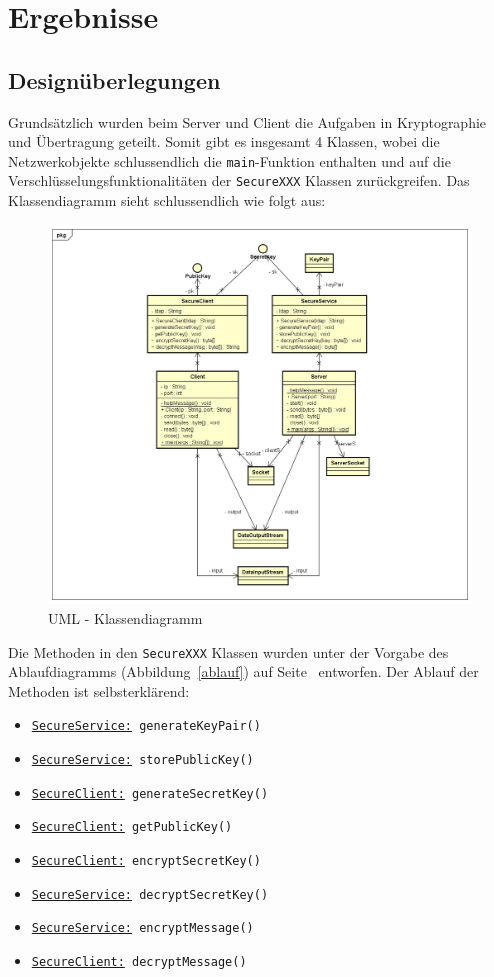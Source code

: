 
\section{Ergebnisse}
\label{sec:Ergebnisse}
\subsection{Designüberlegungen}
Grundsätzlich wurden beim Server und Client die Aufgaben in Kryptographie und Übertragung geteilt. Somit gibt es insgesamt 4 Klassen, wobei die Netzwerkobjekte schlussendlich die \texttt{main}-Funktion enthalten und auf die Verschlüsselungsfunktionalitäten der \texttt{SecureXXX} Klassen zurückgreifen.
Das Klassendiagramm sieht schlussendlich wie folgt aus:\

\begin{figure}[!h]
	\begin{center}
		\includegraphics[width=0.9\linewidth]{images/class_diagram.png}
		\caption{UML - Klassendiagramm}
		\label{classd}
	\end{center}
\end{figure}
Die Methoden in den \texttt{SecureXXX} Klassen wurden unter der Vorgabe des Ablaufdiagramms (Abbildung~\ref{ablauf}) auf Seite~\pageref{ablauf} entworfen.
\clearpage
Der Ablauf der Methoden ist selbsterklärend:
\begin{itemize}
	\item \texttt{\underline{SecureService:} generateKeyPair()}
	\item \texttt{\underline{SecureService:} storePublicKey()}
	\item \texttt{\underline{SecureClient:} generateSecretKey()}
	\item \texttt{\underline{SecureClient:} getPublicKey()}
	\item \texttt{\underline{SecureClient:} encryptSecretKey()}
	\item \texttt{\underline{SecureService:} decryptSecretKey()}
	\item \texttt{\underline{SecureService:} encryptMessage()}
	\item \texttt{\underline{SecureClient:} decryptMessage()}
\end{itemize}

